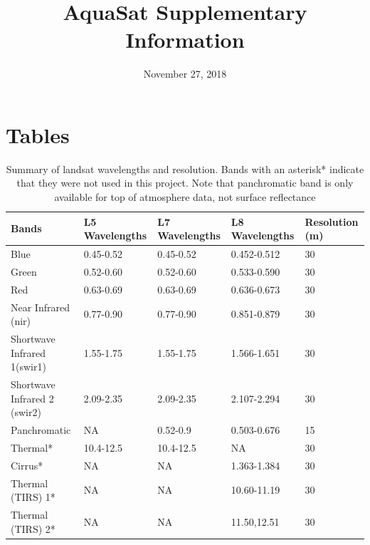 \documentclass[]{article}
\title{AquaSat Supplementary Information}
\author{}
\date{November 27, 2018}
\begin{document}
\maketitle

\hypertarget{tables}{%
\section{Tables}\label{tables}}

\begin{table}

\caption{\label{tab:landsat}Summary of landsat wavelengths and resolution. Bands with an asterisk* indicate that they were not used in this project. Note that panchromatic 
        band is only available for top of atmosphere data, not surface reflectance}
\centering
\begin{tabu} to 
\hline
\textbf{Bands} & \textbf{L5 Wavelengths} & \textbf{L7 Wavelengths} & \textbf{L8 Wavelengths} & \textbf{Resolution (m)}\\
\hline
Blue & 0.45-0.52 & 0.45-0.52 & 0.452-0.512 & 30\\
\hline
Green & 0.52-0.60 & 0.52-0.60 & 0.533-0.590 & 30\\
\hline
Red & 0.63-0.69 & 0.63-0.69 & 0.636-0.673 & 30\\
\hline
Near Infrared (nir) & 0.77-0.90 & 0.77-0.90 & 0.851-0.879 & 30\\
\hline
Shortwave Infrared 1(swir1) & 1.55-1.75 & 1.55-1.75 & 1.566-1.651 & 30\\
\hline
Shortwave Infrared 2 (swir2) & 2.09-2.35 & 2.09-2.35 & 2.107-2.294 & 30\\
\hline
Panchromatic & NA & 0.52-0.9 & 0.503-0.676 & 15\\
\hline
Thermal* & 10.4-12.5 & 10.4-12.5 & NA & 30\\
\hline
Cirrus* & NA & NA & 1.363-1.384 & 30\\
\hline
Thermal (TIRS) 1* & NA & NA & 10.60-11.19 & 30\\
\hline
Thermal (TIRS) 2* & NA & NA & 11.50,12.51 & 30\\
\hline
\end{tabu}
\end{table}
\end{document}
